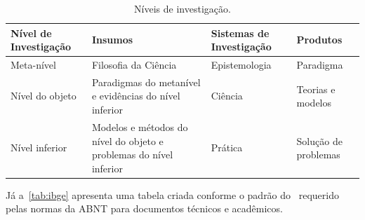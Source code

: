 \begin{table}[htb]
	\ABNTEXfontereduzida{}
	\caption[Níveis de investigação]{Níveis de investigação.}%
	\label{tab:nivinv}
	\begin{tabular}{p{2.6cm}p{6.0cm}p{2.25cm}p{3.40cm}}
		\toprule
		\textbf{Nível de Investigação} & \textbf{Insumos}                                                   & \textbf{Sistemas de Investigação} & \textbf{Produtos}    \\
		\midrule
		Meta-nível                     & Filosofia\index{filosofia} da Ciência                              & Epistemologia                     &
		Paradigma                                                                                                                                                      \\
		\midrule
		Nível do objeto                & Paradigmas do metanível e evidências do nível inferior             &
		Ciência                        & Teorias e modelos                                                                                                             \\
		\midrule
		Nível inferior                 & Modelos e métodos do nível do objeto e problemas do nível inferior & Prática                           & Solução de problemas \\
		\bottomrule
	\end{tabular}
\end{table}

Já a~\cref{tab:ibge} apresenta uma tabela criada conforme o padrão do~ requerido pelas normas da ABNT para documentos técnicos e
acadêmicos.

\begin{table}[htb]
\end{table}

